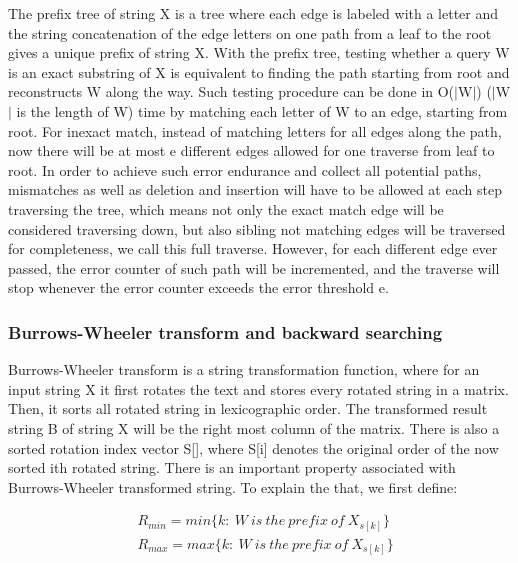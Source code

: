 The prefix tree of string X is a tree where each edge is labeled with a letter
and the string concatenation of the edge letters on one path from a leaf to the
root gives a unique prefix of string X. With the prefix tree, testing whether a
query W is an exact substring of X is equivalent to finding the path starting
from root and reconstructs W along the way. Such testing procedure can be done
in O($\mid$W$\mid$) ($\mid$W$\mid$ is the length of W) time by matching each
letter of W to an edge, starting from root.  For inexact match, instead of
matching letters for all edges along the path, now there will be at most e
different edges allowed for one traverse from leaf to root. In order to achieve
such error endurance and collect all potential paths, mismatches as well as
deletion and insertion will have to be allowed at each step traversing the
tree, which means not only the exact match edge will be considered traversing
down, but also sibling not matching edges will be traversed for completeness,
we call this full traverse.  However, for each different edge ever passed, the
error counter of such path will be incremented, and the traverse will stop
whenever the error counter exceeds the error threshold e.  

\subsubsection{Burrows-Wheeler transform and backward searching} 

Burrows-Wheeler transform is a string transformation function, where for an
input string X it first rotates the text and stores every rotated string in a
matrix. Then, it sorts all rotated string in lexicographic order. The
transformed result string B of string X will be the right most column of the
matrix. There is also a sorted rotation index vector S[], where S[i] denotes
the original order of the now sorted ith rotated string.  There is an important
property associated with Burrows-Wheeler transformed string. To explain the
that, we first define:

\begin{small}
\begin{align*} 
&\mathit{R}_{min} = \mathit{min}\{k:\ W\ is\ the\ prefix\ of\ X_{s[k]}\} \\
&\mathit{R}_{max} = \mathit{max}\{k:\ W\ is\ the\ prefix\ of\ X_{s[k]}\} 
\end{align*}
\end{small}


